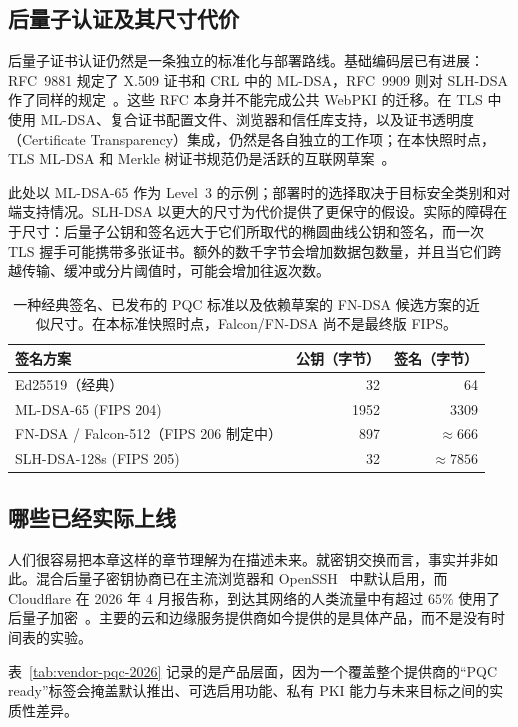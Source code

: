\subsection{后量子认证及其尺寸代价}
后量子证书认证仍然是一条独立的标准化与部署路线。基础编码层已有进展：RFC~9881 规定了 X.509 证书和 CRL 中的 ML-DSA，RFC~9909 则对 SLH-DSA 作了同样的规定~\cite{rfc9881,rfc9909}。这些 RFC 本身并不能完成公共 WebPKI 的迁移。在 TLS 中使用 ML-DSA、复合证书配置文件、浏览器和信任库支持，以及证书透明度（Certificate Transparency）集成，仍然是各自独立的工作项；在本快照时点，TLS ML-DSA 和 Merkle 树证书规范仍是活跃的互联网草案~\cite{tlsmldsa2026,plantsmtc2026}。

此处以 ML-DSA-65 作为 Level~3 的示例；部署时的选择取决于目标安全类别和对端支持情况。SLH-DSA 以更大的尺寸为代价提供了更保守的假设。实际的障碍在于尺寸：后量子公钥和签名远大于它们所取代的椭圆曲线公钥和签名，而一次 TLS 握手可能携带多张证书。额外的数千字节会增加数据包数量，并且当它们跨越传输、缓冲或分片阈值时，可能会增加往返次数。

\begin{table}[H]
\centering
\begin{tabular}{lrr}
\toprule
签名方案 & 公钥（字节） & 签名（字节） \\
\midrule
Ed25519（经典）   & 32   & 64 \\
ML-DSA-65 (FIPS 204)  & 1952 & 3309 \\
FN-DSA / Falcon-512（FIPS 206 制定中） & 897 & $\approx 666$ \\
SLH-DSA-128s (FIPS 205) & 32 & $\approx 7856$ \\
\bottomrule
\end{tabular}
\caption{一种经典签名、已发布的 PQC 标准以及依赖草案的 FN-DSA 候选方案的近似尺寸。在本标准快照时点，Falcon/FN-DSA 尚不是最终版 FIPS。}
\label{tab:sig-sizes}
\end{table}

\subsection{哪些已经实际上线}
\label{sec:pq-adoption}

人们很容易把本章这样的章节理解为在描述未来。就密钥交换而言，事实并非如此。混合后量子密钥协商已在主流浏览器和 OpenSSH~\cite{opensshpq} 中默认启用，而 Cloudflare 在 2026 年 4 月报告称，到达其网络的人类流量中有超过 $65\%$ 使用了后量子加密~\cite{cloudflareroadmap2026}。主要的云和边缘服务提供商如今提供的是具体产品，而不是没有时间表的实验。

表~\ref{tab:vendor-pqc-2026} 记录的是产品层面，因为一个覆盖整个提供商的“PQC ready”标签会掩盖默认推出、可选启用功能、私有 PKI 能力与未来目标之间的实质性差异。

